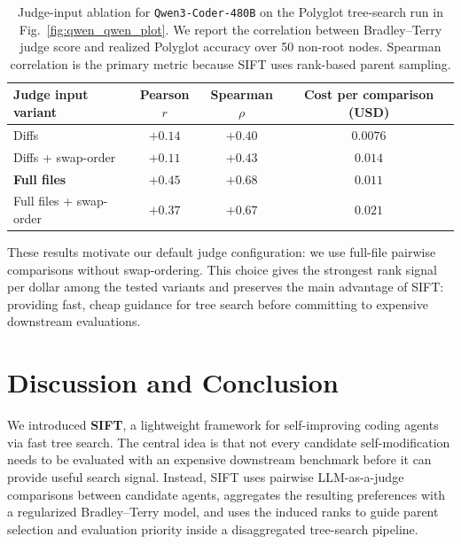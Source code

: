 \documentclass{article}
\begin{document}
\begin{table}[ht]
\vspace{-5mm}
\centering
\caption{
Judge-input ablation for \texttt{Qwen3-Coder-480B} on the Polyglot tree-search run in Fig.~\ref{fig:qwen_qwen_plot}. 
We report the correlation between Bradley--Terry judge score and realized Polyglot accuracy over 50 non-root nodes. 
Spearman correlation is the primary metric because SIFT uses rank-based parent sampling.
}
\label{tab:judge_prompt_smoke_override}
\small
\setlength{\tabcolsep}{5pt}
\begin{tabular}{lccc}
\toprule
\textbf{Judge input variant} & \textbf{Pearson $r$} & \textbf{Spearman $\rho$} & \textbf{Cost per comparison (USD)} \\
\midrule
Diffs                    & $+0.14$ & $+0.40$ & $0.0076$ \\
Diffs + swap-order       & $+0.11$ & $+0.43$ & $0.014$  \\
\textbf{Full files}      & $\mathbf{+0.45}$ & $\mathbf{+0.68}$ & $0.011$ \\
Full files + swap-order  & $+0.37$ & $+0.67$ & $0.021$ \\
\bottomrule
\end{tabular}
\end{table}

These results motivate our default judge configuration: we use full-file pairwise comparisons without swap-ordering. This choice gives the strongest rank signal per dollar among the tested variants and preserves the main advantage of SIFT: providing fast, cheap guidance for tree search before committing to expensive downstream evaluations.

\vspace{-2mm}
\section{Discussion and Conclusion}
\vspace{-2mm}
We introduced \textbf{SIFT}, a lightweight framework for self-improving coding agents via fast tree search. The central idea is that not every candidate self-modification needs to be evaluated with an expensive downstream benchmark before it can provide useful search signal. Instead, SIFT uses pairwise LLM-as-a-judge comparisons between candidate agents, aggregates the resulting preferences with a regularized Bradley--Terry model, and uses the induced ranks to guide parent selection and evaluation priority inside a disaggregated tree-search pipeline.
\end{document}
